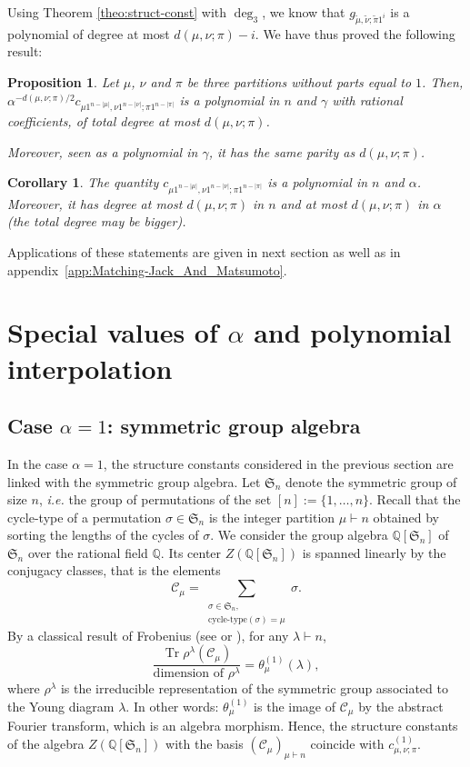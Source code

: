\documentclass[11pt]{amsart}
\theoremstyle{plain}
\newtheorem{corollary}[lemma]{Corollary}
\newtheorem{proposition}[lemma]{Proposition}
\theoremstyle{remark}
\newcommand{\Sym}[1]{\mathfrak{S}_{#1}}
\newcommand{\QQ}{\mathbb{Q}}
\newcommand{\cl}{\mathcal{C}}
\DeclareMathOperator{\Tr}{Tr}
\begin{document}
Using Theorem \ref{theo:struct-const} with $\deg_3$, we know that
$g_{\tilde{\mu},\tilde{\nu};\tilde{\pi} 1^i}$ is a polynomial of degree at most
$d(\mu,\nu;\pi)-i$.
We have thus proved the following result:
\begin{proposition}\label{PropStructureTheta}
    Let $\mu$, $\nu$ and $\pi$ be three partitions without parts equal to $1$.
    Then, \newline
    $\alpha^{-d(\mu,\nu;\pi)/2} c_{\mu 1^{n-|\mu|},\nu 1^{n-|\nu|};\pi 1^{n-|\pi|}}$ is 
    a polynomial in $n$ and $\gamma$ with rational coefficients, of total degree
    at most $d(\mu,\nu;\pi)$.

    Moreover, seen as a polynomial in $\gamma$, it has the same parity as $d(\mu,\nu;\pi)$.
\end{proposition}

\begin{corollary}\label{CorolConnectionSeries}
    The quantity $c_{\mu 1^{n-|\mu|},\nu 1^{n-|\nu|};\pi 1^{n-|\pi|}}$ is a polynomial
    in $n$ and $\alpha$.
    Moreover, it has degree at most $d(\mu,\nu;\pi)$ in $n$ and at most $d(\mu,\nu;\pi)$
    in $\alpha$ (the total degree may be bigger).
\end{corollary}
Applications of these statements are given in next section 
as well as in appendix~\ref{app:Matching-Jack_And_Matsumoto}.

\section{Special values of $\alpha$ and polynomial interpolation}
\label{SectSpecialValues}
\subsection{Case $\alpha=1$: symmetric group algebra}
\label{SubsectStructA1}

In the case $\alpha=1$, the structure constants considered in the previous section are linked
with the symmetric group algebra. Let $\Sym{n}$ denote the symmetric group of size $n$,
\emph{i.e.} the group of permutations of the set $[n]:=\{1,\dots,n\}$.
Recall that the cycle-type of a permutation $\sigma \in \Sym{n}$ is the
integer partition $\mu \vdash n$ obtained by sorting the lengths of the
cycles of $\sigma$.
We consider the group algebra $\QQ[\Sym{n}]$ of $\Sym{n}$ over the rational field $\QQ$.
Its center $Z(\QQ[\Sym{n}])$ is spanned linearly by the conjugacy classes, that is the elements
\[ \cl_\mu = \sum_{\substack{\sigma \in \Sym{n}, \\ \text{cycle-type}(\sigma)=\mu}} \sigma.\]
By a classical result of Frobenius (see \cite{Frobenius1900} or
\cite[(I,7.8)]{Macdonald1995}),
for any $\lambda \vdash n$,
\[
\frac{\Tr \rho^\lambda(\cl_\mu)}{\text{dimension of $\rho^\lambda$}} = \theta_\mu^{(1)}(\lambda),
\]
where $\rho^\lambda$ is the irreducible representation of the symmetric group associated 
to the Young diagram $\lambda$.
In other words: $\theta_\mu^{(1)}$ is the image of $\cl_\mu$ by the abstract Fourier transform,
which is an algebra morphism.
Hence, the structure constants of the algebra $Z(\QQ[\Sym{n}])$ with the basis $(\cl_\mu)_{\mu \vdash n}$
coincide with $c^{(1)}_{\mu,\nu;\pi}$.
\end{document}
